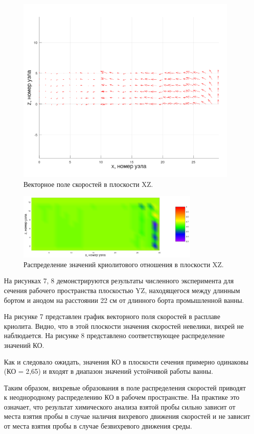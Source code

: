 \documentclass{article}
\begin{document}
\begin{figure}[h!]
    \centering
    \includegraphics[width=110mm]{veloxz_art.png}
    \caption{Векторное поле скоростей в плоскости XZ.}
    \label{fig:3dxyvelo} 
\end{figure}

\begin{figure}[h!]
    \centering
    \includegraphics[width=90mm]{3d xz cr.png}
    \caption{Распределение значений криолитового отношения в плоскости XZ.}
    \label{fig:3dxycr} 
\end{figure}

На рисунках 7, 8 демонстрируются результаты численного эксперимента для сечения рабочего пространства плоскостью YZ, находящегося между длинным бортом и анодом на расстоянии 22 см от длинного борта промышленной ванны.	

На рисунке 7 представлен график векторного поля скоростей в расплаве криолита. Видно, что в этой плоскости значения скоростей невелики, вихрей не наблюдается. На рисунке 8 представлено соответствующее распределение значений КО.

Как и следовало ожидать, значения КО в плоскости сечения примерно одинаковы (КО = 2,65) и входят в диапазон значений устойчивой работы ванны. 

Таким образом, вихревые образования в поле распределения скоростей приводят к неоднородному распределению КО в рабочем пространстве. На практике это означает, что результат химического анализа взятой пробы сильно зависит от места взятия пробы в случае наличия вихревого движения скоростей и не зависит от места взятия пробы в случае безвихревого движения среды.
\end{document}
